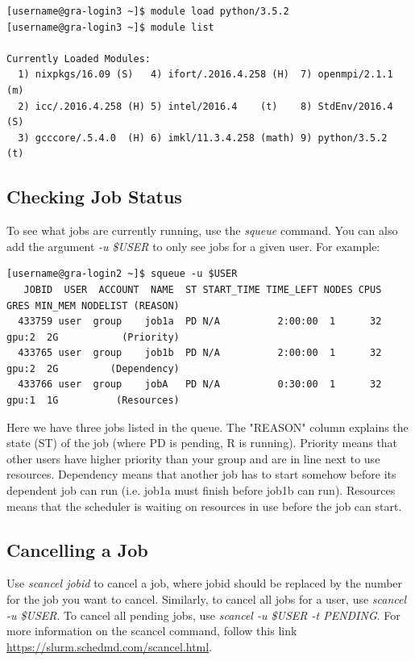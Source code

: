 \documentclass[12pt]{article}
\begin{document}
\begin{lstlisting}[numbers=none]
[username@gra-login3 ~]$ module load python/3.5.2
[username@gra-login3 ~]$ module list

Currently Loaded Modules:
  1) nixpkgs/16.09 (S)   4) ifort/.2016.4.258 (H)  7) openmpi/2.1.1 (m)
  2) icc/.2016.4.258 (H) 5) intel/2016.4    (t)    8) StdEnv/2016.4 (S)
  3) gcccore/.5.4.0  (H) 6) imkl/11.3.4.258 (math) 9) python/3.5.2  (t)

\end{lstlisting}

\subsection{Checking Job Status}

\quad To see what jobs are currently running, use the \textit{squeue} command. You can also add the argument \textit{-u \$USER} to only see jobs for a given user. For example:

\begin{lstlisting}[numbers=none, basicstyle=\tiny]
[username@gra-login2 ~]$ squeue -u $USER
   JOBID  USER  ACCOUNT  NAME  ST START_TIME TIME_LEFT NODES CPUS   GRES MIN_MEM NODELIST (REASON) 
  433759 user  group    job1a  PD N/A          2:00:00  1      32  gpu:2  2G           (Priority) 
  433765 user  group    job1b  PD N/A          2:00:00  1      32  gpu:2  2G         (Dependency) 
  433766 user  group    jobA   PD N/A          0:30:00  1      32  gpu:1  1G          (Resources) 
\end{lstlisting} 

\quad Here we have three jobs listed in the queue. The "REASON" column explains the state (ST) of the job (where PD is pending, R is running). Priority means that other users have higher priority than your group and are in line next to use resources. Dependency means that another job has to start somehow before its dependent job can run (i.e. job1a must finish before job1b can run). Resources means that the scheduler is waiting on resources in use before the job can start. 

\subsection{Cancelling a Job}

\quad Use \textit{scancel jobid} to cancel a job, where jobid should be replaced by the number for the job you want to cancel. Similarly, to cancel all jobs for a user, use \textit{scancel -u \$USER}. To cancel all pending jobs, use \textit{scancel -u \$USER -t PENDING}. For more information on the scancel command, follow this link \url{https://slurm.schedmd.com/scancel.html}.
\end{document}
